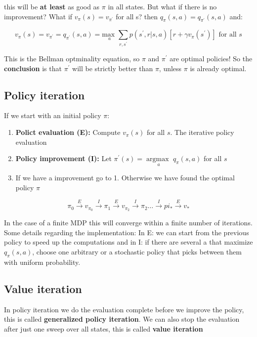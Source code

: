 this will be \textbf{at least} as good as $\pi$ in all states. But what if there is no improvement? What if $v_\pi(s) = v_{\pi^{\prime}}$ for all s? then $q_\pi(s,a) = q_{\pi^{\prime}}(s,a)$ and:

	\begin{equation}
		v_\pi(s) = v_{\pi^{\prime}} = q_{\pi^{\prime}}(s,a) = \underset{a}{\text{max }} \sum_{r, s^{\prime}}^{} p(s^{\prime},r|s,a) [r + \gamma v_\pi(s^{\prime})] \text{ for all }s
	\end{equation}

This is the Bellman optminality equation, so $\pi$ and $\pi^{\prime}$ are optimal policies! So the \textbf{conclusion} is that $\pi^{\prime}$ will be strictly better than $\pi$, unless $\pi$ is already optimal. 


\subsection*{Policy iteration}
If we start with an initial policy $\pi$:

	\begin{enumerate}
	 	\item \textbf{Polict evaluation (E):} Compute $v_\pi(s)$ for all $s$. The iterative policy evaluation
	 	\item \textbf{Policy improvement (I):} Let $\pi^{\prime}(s) = \underset{a}{\arg \text{max }} q_\pi(s,a)$ for all $s$
	 	\item If we have a improvement go to 1. Otherwise we have found the optimal policy $\pi$  
	 \end{enumerate} 

	\begin{equation}
		\pi_0 \overset{E}{\rightarrow}v_{\pi_0} \overset{I}{\rightarrow} \pi_1 \overset{E}{\rightarrow} v_{\pi_2} \overset{I}{\rightarrow} \pi_2 \ldots \overset{I}{\rightarrow} pi_* \overset{E}{\rightarrow} v_*
	\end{equation}

In the case of a finite MDP this will converge within a finite number of iterations. Some details regarding the implementation: In E: we can start from the previous policy to speed up the computations and in I: if there are several a that maximize $q_\pi(s,a)$, choose one arbitrary or a stochastic policy that picks between them with uniform probability. 

\subsection*{Value iteration}
In policy iteration we do the evaluation complete before we improve the policy, this is called \textbf{generalized policy iteration}. We can also stop the evaluation after just one sweep over all states, this is called \textbf{value iteration}

